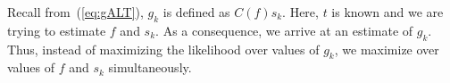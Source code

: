 Recall from~(\ref{eq:gALT}), $g_k$ is defined as $C(f)s_k$.  Here, $t$ is
known and we are trying to estimate $f$ and $s_k$.  As a 
consequence, we arrive at an estimate of $g_k$.  Thus,
instead of maximizing the likelihood over values of $g_k$, we maximize over
values of $f$ and $s_k$ simultaneously. 


